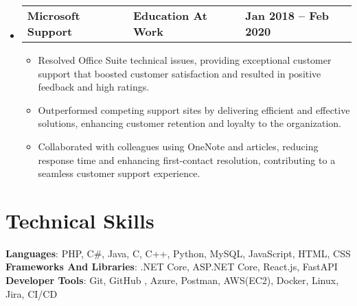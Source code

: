 \documentclass[letterpaper,11pt]{article}
\begin{document}
\begin{itemize}[leftmargin=0.05in, label={}]
	\item{
	            \begin{tabu} {X[l] X[c] X[r]}
		            \textbf{Microsoft Support} & \textbf{Education At Work} & \textbf{Jan 2018 -- Feb 2020} \\
	            \end{tabu}
	            \begin{itemize} [label=$\bullet$]
		            \item{Resolved Office Suite technical issues, providing exceptional customer support that boosted customer satisfaction and resulted in positive feedback and high ratings.}
\item{Outperformed competing support sites by delivering efficient and effective solutions, enhancing customer retention and loyalty to the organization.}
\item{Collaborated with colleagues using OneNote and articles, reducing response time and enhancing first-contact resolution, contributing to a seamless customer support experience.}
	            \end{itemize}
	      }

\end{itemize}


\section{\textbf{Technical Skills}}
\begin{itemize}[leftmargin=0.05in, label={}]
	{\item{
		            \textbf{Languages}{: PHP, C\#, Java, C, C++, Python, MySQL,  JavaScript, HTML, CSS} \\
		            \textbf{Frameworks And Libraries}{: .NET Core, ASP.NET Core, React.js, FastAPI} \\
		            \textbf{Developer Tools}{: Git, GitHub , Azure, Postman, AWS(EC2), Docker, Linux, Jira, CI/CD} \\
		      }}
\end{itemize}


\end{document}
